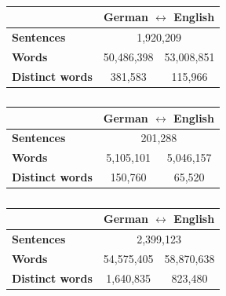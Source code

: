 {\begin{table}[H]
	\centering
    \caption{}
    \label{tab:Europarl}
	\begin{tabular}{l|cc|}
	\cline{2-3}
		& \multicolumn{2}{c|}{\textbf{German $\leftrightarrow$ English}} \\ \hline
		\multicolumn{1}{|l|}{\textbf{Sentences}} & \multicolumn{2}{c|}{1,920,209} \\ \hline
		\multicolumn{1}{|l|}{\textbf{Words}}          & \multicolumn{1}{c|}{50,486,398} & 53,008,851 \\ \hline
		\multicolumn{1}{|l|}{\textbf{Distinct words}} & \multicolumn{1}{c|}{381,583} & 115,966 \\ \hline
	\end{tabular}
\end{table}

\begin{table}[H]
	\centering
    \caption{}
    \label{tab:New Commentary}
	\begin{tabular}{l|cc|}
		\cline{2-3}
		& \multicolumn{2}{c|}{\textbf{German $\leftrightarrow$ English}} \\ \hline
		\multicolumn{1}{|l|}{\textbf{Sentences}}      & \multicolumn{2}{c|}{201,288}                  \\ \hline
		\multicolumn{1}{|l|}{\textbf{Words}}          & \multicolumn{1}{c|}{5,105,101}   & 5,046,157  \\ \hline
		\multicolumn{1}{|l|}{\textbf{Distinct words}} & \multicolumn{1}{c|}{150,760}     & 65,520     \\ \hline
	\end{tabular}
\end{table}

\begin{table}[H]
	\centering
    \caption{}
    \label{tab:Common Crawl}
	\begin{tabular}{l|cc|}
	\cline{2-3}
	& \multicolumn{2}{c|}{\textbf{German $\leftrightarrow$ English}} \\ \hline
	\multicolumn{1}{|l|}{\textbf{Sentences}}      & \multicolumn{2}{c|}{2,399,123}               \\ \hline
	\multicolumn{1}{|l|}{\textbf{Words}}          & \multicolumn{1}{c|}{54,575,405} & 58,870,638 \\ \hline
	\multicolumn{1}{|l|}{\textbf{Distinct words}} & \multicolumn{1}{c|}{1,640,835}  & 823,480    \\ \hline
	\end{tabular}
\end{table}

}
